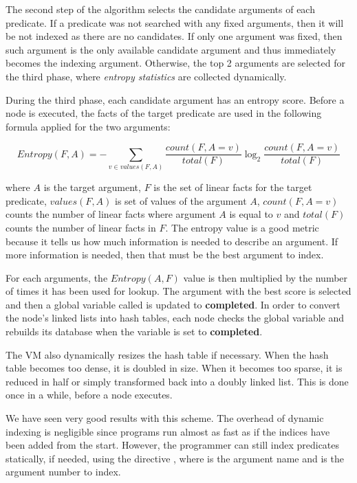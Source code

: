 The second step of the algorithm selects the candidate arguments of each
predicate. If a predicate was not searched with any fixed arguments, then it
will be not indexed as there are no candidates. If only one argument was fixed,
then such argument is the only available candidate argument and thus immediately
becomes the indexing argument. Otherwise, the top 2 arguments are selected for
the third phase, where \emph{entropy statistics} are collected dynamically.

During the third phase, each candidate argument has an entropy score. Before a
node is executed, the facts of the target predicate are used in the following
formula applied for the two arguments:

\[
Entropy(F, A) = - \sum_{v \in values(F, A)} \frac{count(F, A = v)}{total(F)} \log_2 \frac{count(F, A = v)}{total(F)}
\]

\noindent where $A$ is the target argument, $F$ is the set of linear facts for
the target predicate, $values(F, A)$ is set of values of the argument $A$,
$count(F, A = v)$ counts the number of linear facts where argument $A$ is equal
to $v$ and $total(F)$ counts the number of linear facts in $F$.  The entropy
value is a good metric because it tells us how much information is needed to
describe an argument. If more information is needed, then that must be the best
argument to index.

For each arguments, the $Entropy(A, F)$ value is then multiplied by the number
of times it has been used for lookup. The argument with the best score is
selected and then a global variable called  is updated to
\textbf{completed}. In order to convert the node's linked lists into hash
tables, each node checks the global  variable and rebuilds
its database when the variable is set to \textbf{completed}.

The VM also dynamically resizes the hash table if necessary. When the hash table
becomes too dense, it is doubled in size. When it becomes too sparse, it is
reduced in half or simply transformed back into a doubly linked list. This is
done once in a while, before a node executes.

We have seen very good results with this scheme. The overhead of dynamic
indexing is negligible since programs run almost as fast as if the indices have
been added from the start. However, the programmer can still index predicates
statically, if needed, using the directive , where
 is the argument name and  is the argument number to index.
